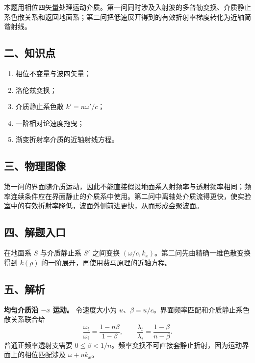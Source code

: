 \documentclass[12pt,a4paper,UTF8]{ctexart}
\newcommand{\tightlist}{\setlength{\itemsep}{0pt}\setlength{\parskip}{0pt}}
\begin{document}
本题用相位四矢量处理运动介质。第一问同时涉及入射波的多普勒变换、介质静止系色散关系和返回地面系；第二问把低速展开得到的有效折射率梯度转化为近轴简谐射线。

\subsection{二、知识点}\label{ux4e8cux77e5ux8bc6ux70b9-7}

\begin{enumerate}
\def\labelenumi{\arabic{enumi}.}
\tightlist
\item
  相位不变量与波四矢量；
\item
  洛伦兹变换；
\item
  介质静止系色散 \(k'=n\omega'/c\)；
\item
  一阶相对论速度拖曳；
\item
  渐变折射率介质的近轴射线方程。
\end{enumerate}

\subsection{三、物理图像}\label{ux4e09ux7269ux7406ux56feux50cf-7}

第一问的界面随介质运动，因此不能直接假设地面系入射频率与透射频率相同；频率连续条件应在界面静止的介质系中使用。第二问中离轴处介质流得更快，使实验室中的有效折射率降低，波面外侧前进更快，从而形成会聚波面。

\subsection{四、解题入口}\label{ux56dbux89e3ux9898ux5165ux53e3-7}

在地面系 \(S\) 与介质静止系 \(S'\) 之间变换
\((\omega/c,k_x)\)。第二问先由精确一维色散变换得到 \(k(\rho)\)
的一阶展开，再使用费马原理的近轴方程。

\subsection{五、解析}\label{ux4e94ux89e3ux6790-7}

\textbf{均匀介质沿 \(-x\) 运动。} 令速度大小为
\(u\)、\(\beta=u/c\)。界面频率匹配和介质静止系色散关系联合给 \[
\boxed{\frac{\omega_t}{\omega_i}=\frac{1-n\beta}{1-\beta}},
\qquad
\boxed{\frac{\lambda_t}{\lambda_i}=\frac{1-\beta}{n-\beta}}.
\] 普通正频率透射支需要
\(0\le\beta<1/n\)。频率变换不可直接套静止折射，因为运动界面上的相位匹配涉及
\(\omega+uk_x\)。
\end{document}
